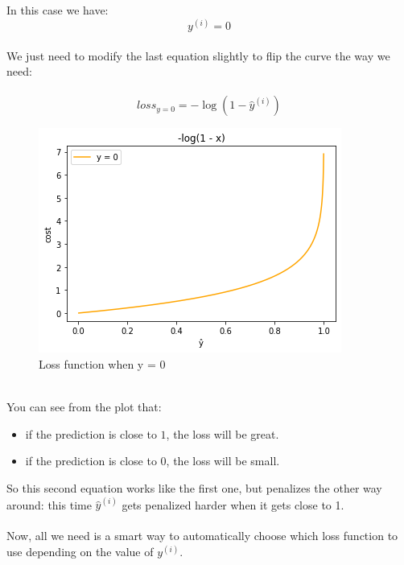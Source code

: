 In this case we have:
$$
y^{(i)} = 0
$$  
\\
We just need to modify the last equation slightly to flip the curve the way we need:\\
\\
$$
loss_{y=0} = -\log(1 - \hat{y}^{(i)})
$$
\begin{figure}[!h]
    \centering
    \includegraphics[scale=0.55]{assets/-log_1-x.png}
    \caption{Loss function when y = 0}
\end{figure}
\newline
\\
You can see from the plot that:
\begin{itemize}
    \item if the prediction is close to $1$, the loss will be great.
    \item if the prediction is close to $0$, the loss will be small.  
\end{itemize}
So this second equation works like the first one, but penalizes the other way around: 
this time $\hat{y}^{(i)}$ gets penalized harder when it gets close to 1.\\
\\
Now, all we need is a smart way to automatically choose which loss function 
to use depending on the value of $y^{(i)}$.\\

